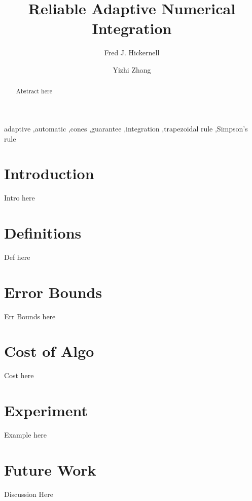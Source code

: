 \documentclass[]{elsarticle}
\theoremstyle{definition}
\theoremstyle{remark}
\begin{document}
  
  
\begin{frontmatter}

\title{Reliable Adaptive Numerical Integration}
\author{Fred J. Hickernell} 
\author{Yizhi Zhang} 
\address{IIT Tower 7th Floor, Illinois Institute of Technology,\\ 10 W.\ 35$^{\text{nd}}$ St., Chicago, IL 60616}
\begin{abstract}
Abstract here
\end{abstract}

\begin{keyword}
adaptive \sep automatic \sep cones \sep  guarantee \sep integration \sep trapezoidal rule \sep Simpson's rule


\end{keyword}
\end{frontmatter}
  
\section{Introduction}
Intro here

\section{Definitions}
Def here

\section{Error Bounds}
Err Bounds here

\section{Cost of Algo}
Cost here

\section{Experiment}
Example here

\section{Future Work}
Discussion Here
  
  
  
  
  
  
  
  
  
  
  
  
  
  
  
\end{document}
